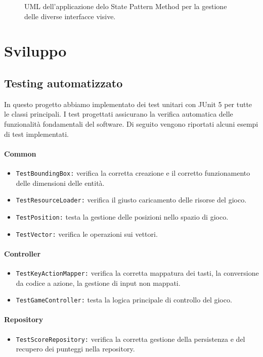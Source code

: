 \documentclass[a4paper,12pt]{report}
\begin{document}
\begin{figure}[H]
	\centering{}
	
	\caption{UML dell'applicazione delo State Pattern Method per la gestione delle diverse interfacce visive.}
	\label{img:AbstractViewState}
\end{figure}
\newpage
\chapter{Sviluppo}
\section{Testing automatizzato}
In questo progetto abbiamo implementato dei test unitari con JUnit 5 per tutte le classi principali. I test progettati assicurano la verifica automatica delle funzionalità fondamentali
del software. Di seguito vengono riportati alcuni esempi di test implementati.

\subsubsection*{Common}
\begin{itemize}
	\item \texttt{TestBoundingBox:} verifica la corretta creazione e il corretto funzionamento delle dimensioni delle entità.
	\item \texttt{TestResourceLoader:} verifica il giusto caricamento delle risorse del gioco.
	\item \texttt{TestPosition:} testa la gestione delle posizioni nello spazio di gioco.
	\item \texttt{TestVector:} verifica le operazioni sui vettori.
\end{itemize}

\subsubsection*{Controller}
\begin{itemize}
	\item \texttt{TestKeyActionMapper:} verifica la corretta mappatura dei tasti, la conversione da codice a azione, la gestione di input non mappati.
	\item \texttt{TestGameController:}  testa la logica principale di controllo del gioco.
\end{itemize}

\subsubsection*{Repository}
\begin{itemize}
	\item \texttt{TestScoreRepository:} verifica la corretta gestione della persistenza e del recupero dei punteggi nella repository.
\end{itemize}
\end{document}
